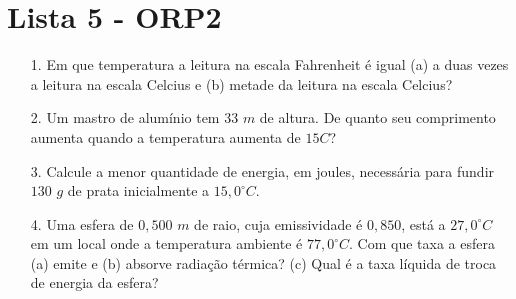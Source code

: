 \section{Lista 5 - ORP2} \label{ch:orp2l5}

\begin{itemize}
\item[1.] \textbf{\cite{Halliday2009vol2}} Em que temperatura a leitura na escala Fahrenheit é igual (a) a duas vezes a leitura na escala Celcius e (b) metade da leitura na escala Celcius?

\item[2.] \textbf{\cite{Halliday2009vol2}} Um mastro de alumínio tem $33$ $m$ de altura. De quanto seu comprimento aumenta quando a temperatura aumenta de $15 $\textdegree$ C$?

\item[3.] \textbf{\cite{Halliday2009vol2}} Calcule a menor quantidade de energia, em joules, necessária para fundir $130$ $g$ de prata inicialmente a $15,0^{\circ}C$.

\item[4.] \textbf{\cite{Halliday2009vol2}} Uma esfera de $0,500$ $m$ de raio, cuja emissividade é $0,850$, está a $27,0^{\circ}C$ em um local onde a temperatura ambiente é $77,0^{\circ}C$. Com que taxa a esfera (a) emite e (b) absorve radiação térmica? (c) Qual é a taxa líquida de troca de energia da esfera?
\end{itemize}